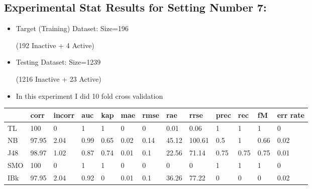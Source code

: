 \documentclass[a4paper,12pt, english]{article}
\begin{document}
\subsection{Experimental Stat Results for Setting Number 7:}
\begin{itemize}
\item Target (Training) Dataset: Size=196 \begin{scriptsize}(192 Inactive + 4 Active)\end{scriptsize}
\item Testing Dataset: Size=1239 \begin{scriptsize}(1216 Inactive + 23 Active)\end{scriptsize}
\item In this experiment I did 10 fold cross validation
\end{itemize}  
\begin{small}
\begin{center}
    \begin{tabular}{ | l | l | l | l | l | l | l | l | l | l | l | l | l |}
    \hline
      	& corr & incorr  & auc & kap & mae & rmse & rae & rrse & prec & rec & fM & err rate\\ \hline
      	TL & 100 & 0 & 1 & 1 & 0 & 0 & 0.01 & 0.06 & 1 & 1 & 1 & 0\\ \hline
	NB & 97.95 & 2.04 & 0.99 & 0.65 & 0.02 & 0.14 & 45.12 & 100.61 & 0.5 & 1 & 0.66 & 0.02\\ \hline
	J48 & 98.97 & 1.02 & 0.87 & 0.74 & 0.01 & 0.1 & 22.56 & 71.14 & 0.75 & 0.75 & 0.75 & 0.01\\ \hline
	SMO & 100 & 0 & 1 & 1 & 0 & 0 & 0 & 0 & 1 & 1 & 1 & 0\\ \hline
	IBk & 97.95 & 2.04 & 0.92 & 0 & 0.01 & 0.1 & 36.26 & 77.22 & 0 & 0 & 0 & 0.02\\ \hline  
    \end{tabular}       
\end{center}
\end{small}
\end{document}
